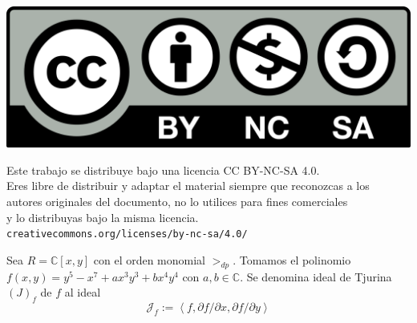\documentclass[10pt,a4paper]{article}
\begin{document}
\parbox[t]{\textwidth}{
  \includegraphics[scale=0.05]{by-nc-sa.png}\\[4pt]
  \raggedright %
  \sffamily\large
  {\Large Este trabajo se distribuye bajo una licencia CC BY-NC-SA 4.0.}\\[4pt]
  Eres libre de distribuir y adaptar el material siempre que reconozcas a los\\
  autores originales del documento, no lo utilices para fines comerciales\\
  y lo distribuyas bajo la misma licencia.\\[4pt]
  \texttt{creativecommons.org/licenses/by-nc-sa/4.0/}
}

\newpage

Sea \(R = \mathbb{C}[x,y]\) con el orden monomial \(>_{dp}\). Tomamos el polinomio \(f(x,y) = y^5 - x^7 + ax^3 y^3 + b x^4 y^4\) con \(a,b \in \mathbb{C}\). Se denomina ideal de Tjurina \((J)_f\) de \(f\) al ideal
\[
    \mathcal{J}_f := \left< f,  \partial f / \partial x, \partial f / \partial y\right>
\]
\end{document}
